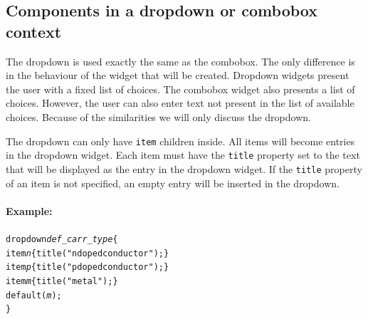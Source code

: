 \subsection{Components in a dropdown or combobox context }
The dropdown is used exactly the same as the combobox. The only difference is
in the behaviour of the widget that will be created. Dropdown widgets present
the user with a fixed list of choices. The combobox widget also presents a list
of choices. However, the user can also enter text not present in the list of
available choices. Because of the similarities we will only discuss the
dropdown.

\bigskip \noindent
The dropdown can only have \verb=item= children inside. All items will become
entries in the dropdown widget. Each item must have the \verb=title= property
set to the text that will be displayed as the entry in the dropdown widget. If
the \verb=title= property of an item is not specified, an empty entry will be
inserted in the dropdown.

\paragraph{Example:}
\begin{alltt}
dropdown \emph{def_carr_type} \{
    item \emph{n} \{ title("n doped conductor"); \}
    item \emph{p} \{ title("p doped conductor"); \}
    item \emph{m} \{ title("metal"); \}
    default(\emph{m});
\}
\end{alltt}

